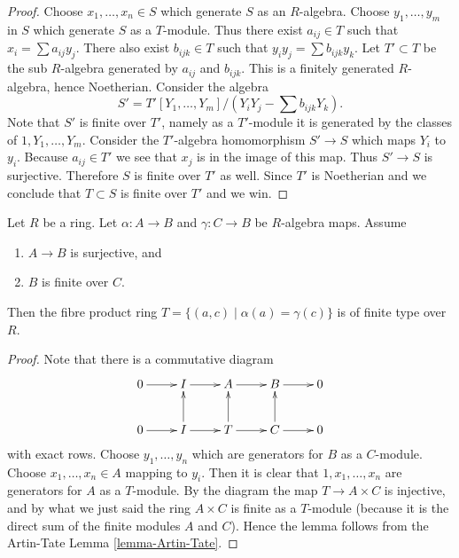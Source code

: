 \begin{proof}
Choose $x_1, \ldots, x_n \in S$ which generate $S$ as an $R$-algebra.
Choose $y_1, \ldots, y_m$ in $S$ which generate $S$ as a $T$-module.
Thus there exist $a_{ij} \in T$ such that
$x_i = \sum a_{ij} y_j$. There also exist $b_{ijk} \in T$ such
that $y_i y_j = \sum b_{ijk} y_k$. Let $T' \subset T$ be the
sub $R$-algebra generated by $a_{ij}$ and $b_{ijk}$. This is a finitely
generated $R$-algebra, hence Noetherian. Consider the algebra
$$
S' = T'[Y_1, \ldots, Y_m]/(Y_i Y_j - \sum b_{ijk} Y_k).
$$
Note that $S'$ is finite over $T'$, namely as a $T'$-module it is
generated by the classes of $1, Y_1, \ldots, Y_m$.
Consider the $T'$-algebra homomorphism $S' \to S$ which maps
$Y_i$ to $y_i$. Because $a_{ij} \in T'$ we see that $x_j$ is
in the image of this map. Thus $S' \to S$ is surjective.
Therefore $S$ is finite over $T'$ as well. Since $T'$ is Noetherian
and we conclude that $T \subset S$ is finite over $T'$ and
we win.
\end{proof}

\begin{lemma}
\label{lemma-fibre-product-finite-type}
Let $R$ be a ring.
Let $\alpha : A \to B$ and $\gamma : C \to B$ be $R$-algebra maps.
Assume
\begin{enumerate}
\item $A \to B$ is surjective, and
\item $B$ is finite over $C$.
\end{enumerate}
Then the fibre product ring $T = \{(a, c) \mid \alpha(a) = \gamma(c)\}$
is of finite type over $R$.
\end{lemma}

\begin{proof}
Note that there is a commutative diagram
$$
\xymatrix{
0 \ar[r] &
I \ar[r] &
A \ar[r] &
B \ar[r] &
0 \\
0 \ar[r] &
I \ar[r] \ar[u] &
T \ar[r] \ar[u] &
C \ar[r] \ar[u] &
0
}
$$
with exact rows. Choose $y_1, \ldots, y_n$ which are generators for
$B$ as a $C$-module. Choose $x_1, \ldots, x_n \in A$ mapping to $y_i$.
Then it is clear that $1, x_1, \ldots, x_n$ are generators for
$A$ as a $T$-module. By the diagram the map
$T \to A \times C$ is injective, and by what we just said the
ring $A \times C$ is finite as a $T$-module (because it is the
direct sum of the finite modules $A$ and $C$).
Hence the lemma follows from the Artin-Tate Lemma \ref{lemma-Artin-Tate}.
\end{proof}






















